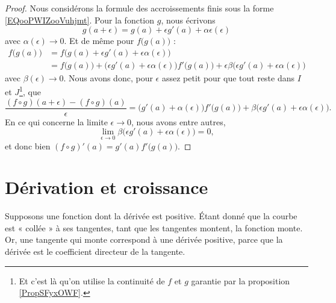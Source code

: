 \begin{proof}
    Nous considérons la formule des accroissements finis sous la forme \eqref{EQooPWIZooVuhjmt}. Pour la fonction \( g\), nous écrivons
    \begin{equation}
        g(a+\epsilon)=g(a)+\epsilon g'(a)+\alpha\epsilon(\epsilon)
    \end{equation}
    avec \( \alpha(\epsilon)\to 0\). Et de même pour \( f\big( g(a) \big)\) :
    \begin{subequations}
        \begin{align}
            f\big( g(a) \big)&=f\big( g(a)+\epsilon g'(a)+\epsilon\alpha(\epsilon) \big)\\
            &=f\big( g(a) \big)+\big( \epsilon g'(a)+\epsilon\alpha(\epsilon) \big)f'\big( g(a) \big)+\epsilon\beta\big( \epsilon g'(a)+\epsilon\alpha(\epsilon) \big)
        \end{align}
    \end{subequations}
    avec \( \beta(\epsilon)\to 0\). Nous avons donc, pour \( \epsilon\) assez petit pour que tout reste dans \( I\) et \( J\)\footnote{Et c'est là qu'on utilise la continuité de \( f\) et \( g\) garantie par la proposition \ref{PropSFyxOWF}.}, que
    \begin{equation}
            \frac{ (f\circ g)(a+\epsilon)-(f\circ g)(a) }{ \epsilon }=\big( g'(a)+\alpha(\epsilon) \big)f'\big( g(a) \big)+\beta\big( \epsilon g'(a)+\epsilon\alpha(\epsilon) \big).
    \end{equation}
    En ce qui concerne la limite \( \epsilon\to 0\), nous avons entre autres,
    \begin{equation}
        \lim_{\epsilon\to 0}\beta\big( \epsilon g'(a)+\epsilon\alpha(\epsilon) \big)=0,
    \end{equation}
    et donc bien \( (f\circ g)'(a)=g'( a )f'\big( g(a) \big)\).
\end{proof}

\section{Dérivation et croissance}

Supposons une fonction dont la dérivée est positive. Étant donné que la courbe est « collée » à ses tangentes, tant que les tangentes montent, la fonction monte. Or, une tangente qui monte correspond à une dérivée positive, parce que la dérivée est le coefficient directeur de la tangente.

